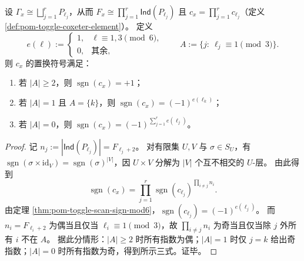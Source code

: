 \begin{theorem}[一般纤维扫描元的奇偶分解]\label{thm:pom-toggle-scan-sign-general-fiber}
设 \(\Gamma_x\cong\bigsqcup_{j=1}^r P_{\ell_j}\)，从而 \(F_x\cong\prod_{j=1}^r\mathsf{Ind}(P_{\ell_j})\) 且 \(c_x=\prod_{j=1}^r c_{\ell_j}\)（定义 \ref{def:pom-toggle-coxeter-element}）。
定义
\[
e(\ell):=
\begin{cases}
1,& \ell\equiv 1,3\pmod 6,\\
0,& \text{其余},
\end{cases}
\qquad
A:=\{j:\ \ell_j\equiv 1\pmod 3\}.
\]
则 \(c_x\) 的置换符号满足：
\begin{enumerate}
  \item 若 \(|A|\ge 2\)，则 \(\operatorname{sgn}(c_x)=+1\)；
  \item 若 \(|A|=1\) 且 \(A=\{k\}\)，则 \(\operatorname{sgn}(c_x)=(-1)^{e(\ell_k)}\)；
  \item 若 \(|A|=0\)，则 \(\operatorname{sgn}(c_x)=(-1)^{\sum_{j=1}^r e(\ell_j)}\)。
\end{enumerate}
\end{theorem}

\begin{proof}
记 \(n_j:=|\mathsf{Ind}(P_{\ell_j})|=F_{\ell_j+2}\)。
对有限集 \(U,V\) 与 \(\sigma\in S_U\)，有 \(\operatorname{sgn}(\sigma\times\mathrm{id}_V)=\operatorname{sgn}(\sigma)^{|V|}\)，因 \(U\times V\) 分解为 \(|V|\) 个互不相交的 \(U\)-层。
由此得到
\[
\operatorname{sgn}(c_x)=\prod_{j=1}^r \operatorname{sgn}(c_{\ell_j})^{\prod_{i\ne j}n_i}.
\]
由定理 \ref{thm:pom-toggle-scan-sign-mod6}，\(\operatorname{sgn}(c_{\ell_j})=(-1)^{e(\ell_j)}\)。
而 \(n_i=F_{\ell_i+2}\) 为偶当且仅当 \(\ell_i\equiv 1\pmod 3\)，故 \(\prod_{i\ne j}n_i\) 为奇当且仅当除 \(j\) 外所有 \(i\) 不在 \(A\)。
据此分情形：\(|A|\ge 2\) 时所有指数为偶；\(|A|=1\) 时仅 \(j=k\) 给出奇指数；\(|A|=0\) 时所有指数为奇，得到所示三式。证毕。
\end{proof}

